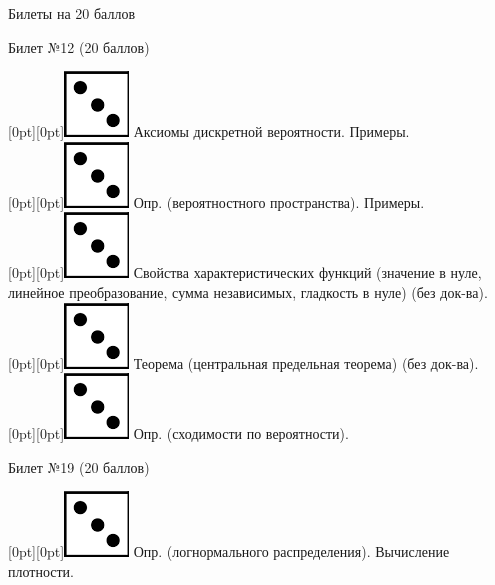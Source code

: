 \documentclass[10pt]{article}
\begin{document}
\thispagestyle{empty}



\begin{center}

    Билеты на 20 баллов

\end{center}

\begin{center} {\Large Билет №12 (20 баллов)} \end{center}

\raisebox{-1pt}[0pt][0pt]{\includegraphics[width=0.02\linewidth]{3.png}} Аксиомы дискретной вероятности. Примеры. \\

\raisebox{-1pt}[0pt][0pt]{\includegraphics[width=0.02\linewidth]{3.png}} Опр. (вероятностного пространства). Примеры. \\

\raisebox{-1pt}[0pt][0pt]{\includegraphics[width=0.02\linewidth]{3.png}} Свойства характеристических функций (значение в нуле, линейное преобразование, сумма независимых, гладкость в нуле) (без док-ва). \\

\raisebox{-1pt}[0pt][0pt]{\includegraphics[width=0.02\linewidth]{3.png}} Теорема (центральная предельная теорема) (без док-ва). \\

\raisebox{-1pt}[0pt][0pt]{\includegraphics[width=0.02\linewidth]{3.png}} Опр. (сходимости по вероятности). \\

\begin{center} {\Large Билет №19 (20 баллов)} \end{center}

\raisebox{-1pt}[0pt][0pt]{\includegraphics[width=0.02\linewidth]{3.png}} Опр. (логнормального распределения). Вычисление плотности. \\
\end{document}
